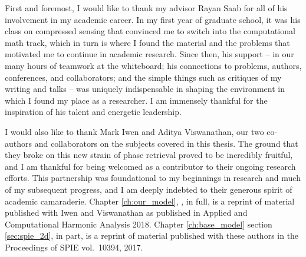  First and foremost, I would like to thank my advisor Rayan Saab for all of his involvement in my academic career.  In my first year of graduate school, it was his class on compressed sensing that convinced me to switch into the computational math track, which in turn is where I found the material and the problems that motivated me to continue in academic research.  Since then, his support -- in our many hours of teamwork at the whiteboard; his connections to problems, authors, conferences, and collaborators; and the simple things such as critiques of my writing and talks -- was uniquely indispensable in shaping the environment in which I found my place as a researcher.  I am immensely thankful for the inspiration of his talent and energetic leadership.

  I would also like to thank Mark Iwen and Aditya Viswanathan, our two co-authors and collaborators on the subjects covered in this thesis.  The ground that they broke on this new strain of phase retrieval proved to be incredibly fruitful, and I am thankful for being welcomed as a contributor to their ongoing research efforts.  This partnership was foundational to my beginnings in research and much of my subsequent progress, and I am deeply indebted to their generous spirit of academic camaraderie.  Chapter \ref{ch:our_model}, , in full, is a reprint of material published with Iwen and Viswanathan as published in Applied and Computational Harmonic Analysis 2018.  Chapter \ref{ch:base_model} section \ref{sec:spie_2d}, in part, is a reprint of material published with these authors in the Proceedings of SPIE vol.~10394, 2017.

  
